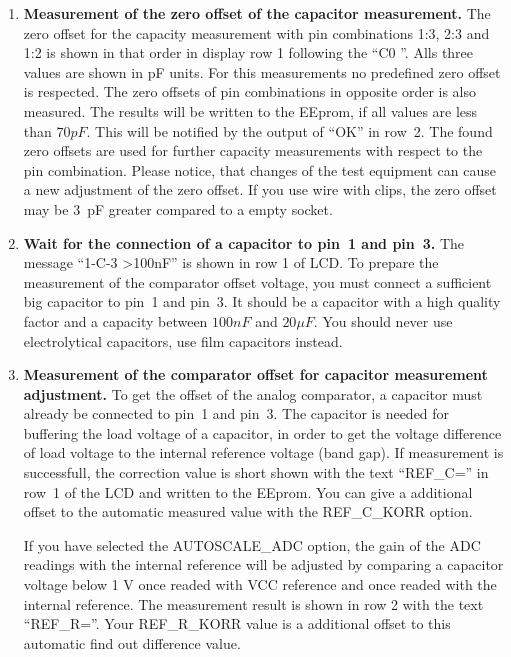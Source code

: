 \begin{enumerate}
\item {\bf Measurement of the zero offset of the capacitor measurement.}
The zero offset for the capacity measurement with pin combinations 1:3, 2:3 and 1:2 is shown in that order
in display row 1 following the ``C0 ''.
Alls three values are shown in pF units.
For this measurements no predefined zero offset is respected.
The zero offsets of pin combinations in opposite order is also measured.
The results will be written to the EEprom, if all values are less than \(70 pF\).
This will be notified by the output of ``OK'' in row~2.
The found zero offsets are used for further capacity measurements with respect to the pin combination.
Please notice, that changes of the test equipment can cause a new adjustment of the zero offset.
If you use wire with clips, the zero offset may be 3~pF greater compared to a empty socket.

\item {\bf Wait for the connection of a capacitor to pin~1 and pin~3.}
The message ``1-C-3 \textgreater 100nF'' is shown in row 1 of LCD.
To prepare the measurement of the comparator offset voltage, you must connect
a sufficient big capacitor to pin~1 and pin~3.
It should be a capacitor with a high quality factor and a capacity between \(100 nF\) and \(20 \mu F\).
You should never use electrolytical capacitors, use film capacitors instead.

\item {\bf Measurement of the comparator offset for capacitor measurement adjustment.}
To get the offset of the analog comparator, a capacitor must already be connected to pin~1 and pin~3.
The capacitor is needed for buffering the load voltage of a capacitor, in order to get the voltage
difference of load voltage to the internal reference voltage (band gap).
If measurement is successfull, the correction value is short shown with the text ``REF\_C='' in row~1 of 
the LCD and written to the EEprom. You can give a additional offset to the automatic measured value
with the REF\_C\_KORR option.

If you have selected the AUTOSCALE\_ADC option, the gain of the ADC readings with the internal reference
will be adjusted by comparing a capacitor voltage below 1 V once readed with VCC reference and once
readed with the internal reference. 
The measurement result is shown in row 2 with the text ``REF\_R=''. 
Your REF\_R\_KORR value is a additional offset to this automatic find out difference value.

\end{enumerate}

